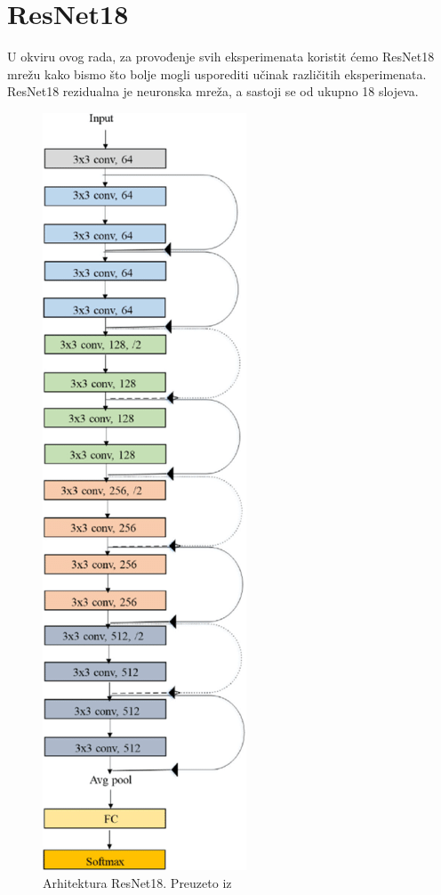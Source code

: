 \documentclass[times, utf8, zavrsni, numeric]{fer}
\begin{document}
\section{ResNet18}

U okviru ovog rada, za provođenje svih eksperimenata koristit ćemo ResNet18 mrežu kako bismo što bolje mogli usporediti učinak različitih eksperimenata. 
ResNet18 rezidualna je neuronska mreža, a sastoji se od ukupno 18 slojeva. 

\begin{figure}[htb]
    \centering
    \includegraphics[scale=0.7]{resnet18.png}
    \caption{Arhitektura ResNet18. Preuzeto iz~\cite{mcc19}}
    \label{fig:resnet18}
\end{figure}
\end{document}

